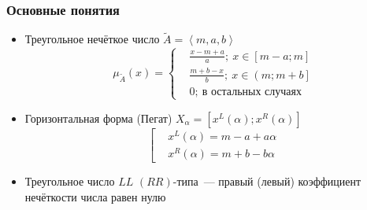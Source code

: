 \documentclass[12pt]{beamer}
\begin{document}
\begin{frame}
  \frametitle{Основные понятия}
  \begin{itemize}
    \item Треугольное нечёткое число $\tilde A = \left\langle m,a,b \right\rangle $
      \begin{equation}
        \mu_{\tilde A}\left( x \right)=
        \left\{ \begin{aligned}
			& \frac{x-m+a}{a};\ x\in \left[ m-a;m \right] \\ 
			& \frac{m+b-x}{b};\ x\in \left( m;m+b \right] \\ 
			& 0;\ \text{в остальных случаях} 
	 	\end{aligned} \right.
      \end{equation}
    \item Горизонтальная форма (Пегат) $X_\alpha = \left[x^L(\alpha); x^R(\alpha) \right]$
      \begin{equation}
        \left[ 
          \begin{aligned}
            & x^L(\alpha )=m-a+a\alpha  \\ 
            & x^R(\alpha )=m+b-b\alpha
          \end{aligned}
        \right.
      \end{equation}
    \item Треугольное число $LL$ $\left( RR \right)$-типа~--- правый (левый) коэффициент нечёткости числа равен нулю
  \end{itemize}
\end{frame}

\end{document}

